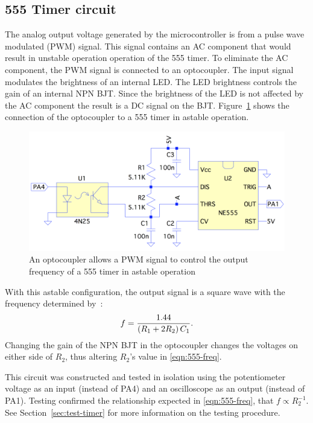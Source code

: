 \subsection{555 Timer circuit}\label{sec:circuit}
The analog output voltage generated by the microcontroller is from a pulse wave modulated (PWM) signal.
This signal contains an AC component that would result in unstable operation operation of the 555 timer.
To eliminate the AC component, the PWM signal is connected to an optocoupler.
The input signal modulates the brightness of an internal LED.
The LED brightness controls the gain of an internal NPN BJT.
Since the brightness of the LED is not affected by the AC component the result is a DC signal on the BJT.
Figure~\ref{fig:schematic_opto-to-555} shows the connection of the optocoupler to a 555 timer in astable operation.

\begin{figure}[tbph]
  \centering
  \includegraphics[width=0.8\linewidth]{../graphics/schematic_opto-to-555}
  \caption{An optocoupler allows a PWM signal to control the output frequency of a 555 timer in astable operation}
  \label{fig:schematic_opto-to-555}
\end{figure}

With this astable configuration, the output signal is a square wave with the frequency determined by~\cite{STM:555}:
\begin{equation}\label{eqn:555-freq}
  f = {1.44 \over \left(R_1 + 2R_2\right) C_1}.
\end{equation}
Changing the gain of the NPN BJT in the optocoupler changes the voltages on either side of $R_2$, thus altering $R_2$'s value in \eqref{eqn:555-freq}.

This circuit was constructed and tested in isolation using the potentiometer voltage as an input (instead of PA4) and an oscilloscope as an output (instead of PA1).
Testing confirmed the relationship expected in \eqref{eqn:555-freq}, that $f \propto R_2^{-1}$.
See Section~\ref{sec:test-timer} for more information on the testing procedure.

